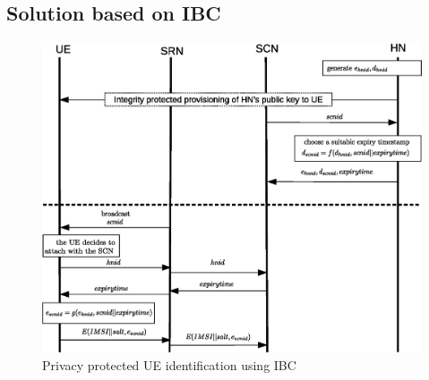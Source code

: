 \documentclass[lnicst,sechang,a4paper]{svmultln}
\begin{document}
\subsection{Solution based on IBC} 
\label{sub_sec:solution_ibc}


\begin{figure}
\begin{center}
  \includegraphics[width=.98\textwidth]{solution_based_on_ibc.eps}
\caption{Privacy protected UE identification using IBC}
\label{fig:solution_ibc}       %
\end{center}
\end{figure}



\end{document}
